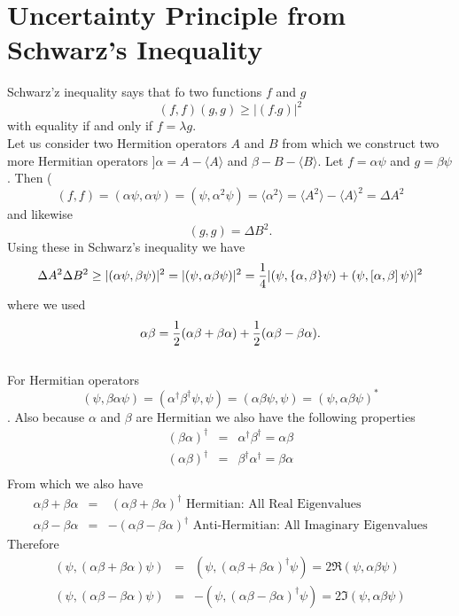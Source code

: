 \section{Uncertainty Principle from Schwarz's Inequality}

   Schwarz'z inequality says that fo two functions $f$ and $g$ 
   \[ (f,f) (g,g) \ge |(f.g)|^2\] with equality if and only if $f=\lambda g$. \\
   
   Let us consider two Hermition operators $A$ and $B$ from which we construct two more Hermitian operators $]\alpha = A - \langle A\rangle  $ and $\beta - B - \langle B\rangle  $. Let $f = \alpha \psi$ and $g = \beta \psi$. Then
   (\[ (f,f) = (\alpha \psi, \alpha \psi) = (\psi, \alpha^2 \psi) = \langle \alpha^2\rangle   = \langle A^2\rangle   - \langle A\rangle  ^2 = \Delta A^2\] and likewise \[(g,g) = \Delta B^2.\] Using these in Schwarz's inequality we have
   $$ \Delta A^2 \Delta B^2 \ge | (\alpha \psi, \beta \psi)|^2 = |(\psi,\alpha\beta \psi)|^2 = {1\over 4}|(\psi,\{ \alpha, \beta\}\psi) + (\psi, \left[ \alpha,\beta\right]\psi)|^2$$  where we used 
   $$\alpha\beta = {1\over2}(\alpha\beta + \beta\alpha) + {1\over2} (\alpha\beta - \beta\alpha).$$\\
   For Hermitian operators $$(\psi,\beta \alpha \psi) = (\alpha^\dagger\beta^\dagger\psi, \psi) = (\alpha \beta \psi, \psi) = (\psi, \alpha \beta \psi )^*$$. Also because $\alpha$ and $\beta$ are Hermitian we also have the following 
   properties 
   \begin{eqnarray*}
   (\beta\alpha)^\dagger &=& \alpha^\dagger\beta^\dagger = \alpha\beta\\
   (\alpha\beta)^\dagger &=& \beta^\dagger\alpha^\dagger = \beta\alpha\\
   \end{eqnarray*}From which we also have
   \begin{eqnarray*}
   \alpha\beta + \beta\alpha &=& ~(\alpha\beta + \beta\alpha)^\dagger \mbox{ Hermitian: All Real Eigenvalues}\\ 
   \alpha\beta - \beta\alpha &=&   -(\alpha\beta - \beta\alpha)^\dagger \mbox{ Anti-Hermitian: All Imaginary Eigenvalues}
   \end{eqnarray*}Therefore
    \begin{eqnarray*}
   (\psi,(\alpha\beta + \beta\alpha)\psi) &=& (\psi,(\alpha\beta + \beta\alpha)^\dagger\psi)  = 2\Re(\psi,\alpha\beta\psi)\\ 
   (\psi,(\alpha\beta - \beta\alpha)\psi) &=& -(\psi,(\alpha\beta - \beta\alpha)^\dagger\psi)  = 2\Im(\psi,\alpha\beta\psi)
   \end{eqnarray*} 
